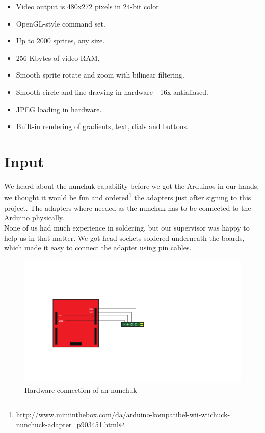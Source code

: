 \begin{multicols}{2}
\begin{itemize}
  \footnotesize
    \item Video output is 480x272 pixels in 24-bit color.
    \item OpenGL-style command set.
    \item Up to 2000 sprites, any size.
    \item 256 Kbytes of video RAM.
    \item Smooth sprite rotate and zoom with bilinear filtering.
    \item Smooth circle and line drawing in hardware - 16x antialiased.
    \item JPEG loading in hardware.
    \item Built-in rendering of gradients, text, dials and buttons.
  \end{itemize}
\end{multicols}

\section{Input}%
We heard about the nunchuk capability before we got the Arduinos in our
hands, we thought it would be fun and ordered\footnote{http://www.miniinthebox.com/da/arduino-kompatibel-wii-wiichuck-nunchuck-adapter\_p903451.html} the adapters just after signing
to this project. The adapters where needed as the nunchuk
has to be connected to the Arduino physically.
\\
None of us had much experience in soldering, but our supervisor was happy
to help us in that matter. We got head sockets soldered underneath
the boards, which made it easy to connect the adapter using pin cables.

\begin{figure}[h]
  \centering
  \includegraphics[scale=0.7]{Figures/NunchuckConnection}
  \caption{Hardware connection of an nunchuk}
  \label{fig:nunchuk_connect}
\end{figure}


